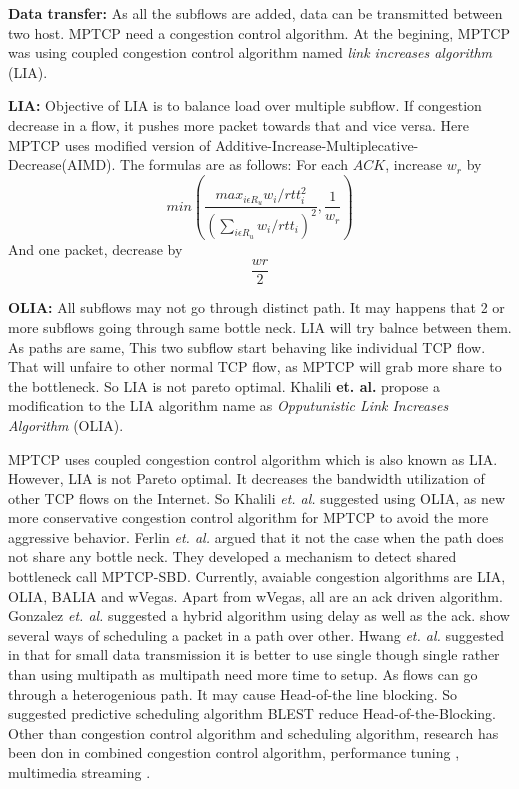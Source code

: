 \textbf{Data transfer:}
As all the subflows are added, data can be transmitted between two host. MPTCP need a congestion control algorithm. At the begining, MPTCP was using coupled congestion control algorithm named \textit{link increases algorithm} (LIA)\cite{LIARFC6356}. 

\textbf{LIA:} Objective of LIA is to balance load over multiple subflow. If congestion decrease in a flow, it pushes more packet towards that and vice versa. Here MPTCP uses modified version of Additive-Increase-Multiplecative-Decrease(AIMD). The formulas are as follows:
For each $ACK$, increase $w_r$ by 
$$min\left( \frac{max_{i\epsilon R_u} w_i/rtt_i^2}{\left(\sum_{i\epsilon R_u}w_i/rtt_i\right)^2}, \frac{1}{w_r}\right) $$
And one packet, decrease by $$\frac{wr}{2}$$

\textbf{OLIA:} All subflows may not go through distinct path. It may happens that 2 or more subflows going through same bottle neck. LIA will try balnce between them. As paths are same, This two subflow start behaving like individual TCP flow. That will unfaire to other normal TCP flow, as MPTCP will grab more share to the bottleneck. So LIA is not pareto optimal\cite{OLIARamin2012}. Khalili \textbf{et. al.} propose a modification to the LIA algorithm name as \textit{Opputunistic Link Increases Algorithm} (OLIA).


MPTCP uses coupled congestion control algorithm which is also known as LIA\cite{LIARFC6356}. However, LIA is not Pareto optimal\cite{OLIARamin2012}. It decreases the bandwidth utilization of other TCP flows on the Internet. So Khalili \textit{et. al.} suggested using OLIA, as new more conservative congestion control algorithm for MPTCP to avoid the more aggressive behavior. Ferlin \textit{et. al.} argued that it not the case when the path does not share any bottle neck\cite{MPTCP-SBD}. They developed a mechanism to detect shared bottleneck call MPTCP-SBD.
Currently, avaiable congestion algorithms are LIA, OLIA, BALIA and wVegas\cite{wVegas}. Apart from wVegas, all are an ack driven algorithm. Gonzalez \textit{et. al.} suggested a hybrid algorithm\cite{Balia-wvegas} using delay as well as the ack. \cite{aschedulermptcp,blestschedular,scheadulerformptcp} show several ways of scheduling a packet in a path over other. Hwang \textit{et. al.} suggested in \cite{scheadulerformptcp} that for small data transmission it is better to use single though single rather than using multipath as multipath need more time to setup. As flows can go through a heterogenious path. It may cause Head-of-the line blocking. So \cite{blestschedular} suggested predictive scheduling algorithm BLEST reduce Head-of-the-Blocking. Other than congestion control algorithm and scheduling algorithm, research has been don in combined congestion control algorithm\cite{outofordermptcp}, performance tuning \cite{optimization}, multimedia streaming \cite{streaming}.


